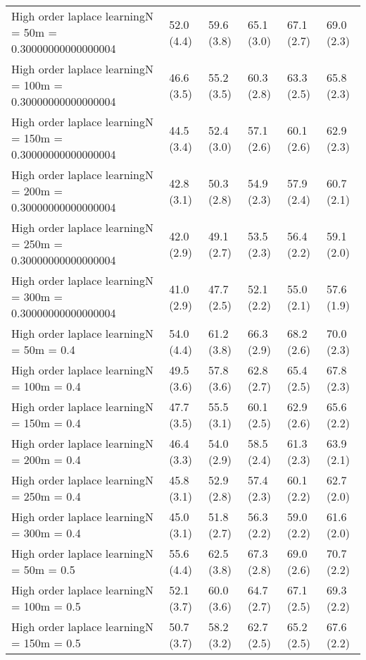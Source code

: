 \documentclass{article}
\begin{document}
\begin{table*}[t!]
\begin{center}
\begin{small}
\begin{sc}
\begin{tabular}{llllll}
High order laplace learningN = 50m = 0.30000000000000004&52.0 (4.4)      &59.6 (3.8)      &65.1 (3.0)      &67.1 (2.7)      &69.0 (2.3)      \\
High order laplace learningN = 100m = 0.30000000000000004&46.6 (3.5)      &55.2 (3.5)      &60.3 (2.8)      &63.3 (2.5)      &65.8 (2.3)      \\
High order laplace learningN = 150m = 0.30000000000000004&44.5 (3.4)      &52.4 (3.0)      &57.1 (2.6)      &60.1 (2.6)      &62.9 (2.3)      \\
High order laplace learningN = 200m = 0.30000000000000004&42.8 (3.1)      &50.3 (2.8)      &54.9 (2.3)      &57.9 (2.4)      &60.7 (2.1)      \\
High order laplace learningN = 250m = 0.30000000000000004&42.0 (2.9)      &49.1 (2.7)      &53.5 (2.3)      &56.4 (2.2)      &59.1 (2.0)      \\
High order laplace learningN = 300m = 0.30000000000000004&41.0 (2.9)      &47.7 (2.5)      &52.1 (2.2)      &55.0 (2.1)      &57.6 (1.9)      \\
High order laplace learningN = 50m = 0.4&54.0 (4.4)      &61.2 (3.8)      &66.3 (2.9)      &68.2 (2.6)      &70.0 (2.3)      \\
High order laplace learningN = 100m = 0.4&49.5 (3.6)      &57.8 (3.6)      &62.8 (2.7)      &65.4 (2.5)      &67.8 (2.3)      \\
High order laplace learningN = 150m = 0.4&47.7 (3.5)      &55.5 (3.1)      &60.1 (2.5)      &62.9 (2.6)      &65.6 (2.2)      \\
High order laplace learningN = 200m = 0.4&46.4 (3.3)      &54.0 (2.9)      &58.5 (2.4)      &61.3 (2.3)      &63.9 (2.1)      \\
High order laplace learningN = 250m = 0.4&45.8 (3.1)      &52.9 (2.8)      &57.4 (2.3)      &60.1 (2.2)      &62.7 (2.0)      \\
High order laplace learningN = 300m = 0.4&45.0 (3.1)      &51.8 (2.7)      &56.3 (2.2)      &59.0 (2.2)      &61.6 (2.0)      \\
High order laplace learningN = 50m = 0.5&55.6 (4.4)      &62.5 (3.8)      &67.3 (2.8)      &69.0 (2.6)      &70.7 (2.2)      \\
High order laplace learningN = 100m = 0.5&52.1 (3.7)      &60.0 (3.6)      &64.7 (2.7)      &67.1 (2.5)      &69.3 (2.2)      \\
High order laplace learningN = 150m = 0.5&50.7 (3.7)      &58.2 (3.2)      &62.7 (2.5)      &65.2 (2.5)      &67.6 (2.2)      \\

\end{tabular}
\end{sc}
\end{small}
\end{center}
\end{table*}
\end{document}
